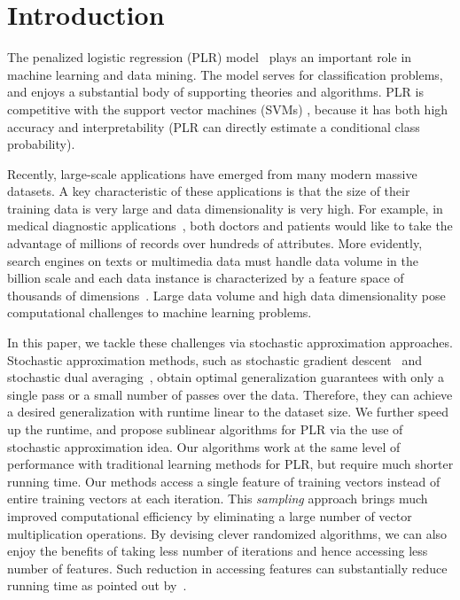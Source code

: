 \documentclass{llncs}
\begin{document}
\section{Introduction} \label{sec:int}

The penalized logistic regression (PLR) model~\cite{HastieBook:SL}  plays an important role in machine learning and data mining.
The model serves for classification problems, and enjoys a substantial body of supporting theories and algorithms.
PLR is competitive with the support vector machines (SVMs) \cite{Vapnik:1998}, because it has both high accuracy and  interpretability (PLR can directly estimate a conditional class probability).

Recently, large-scale applications have emerged from many modern massive datasets.
A key characteristic of these applications is that the size of their training data is very large and data dimensionality is very high.
For example, in medical diagnostic applications~\cite{tsumoto2004mining}, both doctors and patients would like to take the advantage of millions of records over hundreds of attributes. More evidently, search engines on texts or multimedia data must handle data volume in the billion scale and each data instance is characterized by a feature space of thousands of dimensions~\cite{genkin2007large}.
Large data volume and high data dimensionality pose computational challenges to machine learning problems.

In this paper, we tackle these challenges via stochastic approximation approaches.
Stochastic approximation methods, such as stochastic gradient descent~\cite{zhang2004solving} and stochastic dual averaging~\cite{xiao2010dual}, obtain optimal generalization guarantees
with only a single pass or a small number of passes over the data.
Therefore, they can achieve a desired generalization  with runtime linear to the dataset size.
We further speed up the runtime, and propose sublinear algorithms for PLR via the use of stochastic approximation idea.
Our algorithms work at the same level of performance with traditional learning methods for PLR, but require much shorter running time.
Our methods access a single feature of training vectors instead of entire training vectors at each iteration.
This {\em sampling} approach brings much improved computational efficiency by eliminating a large number of vector multiplication operations.
By devising clever randomized algorithms, we can also enjoy the benefits of taking less number of iterations and hence accessing less number of features.
Such reduction in accessing features can substantially reduce running time as pointed out by~\cite{hazanbeating}.
\end{document}
